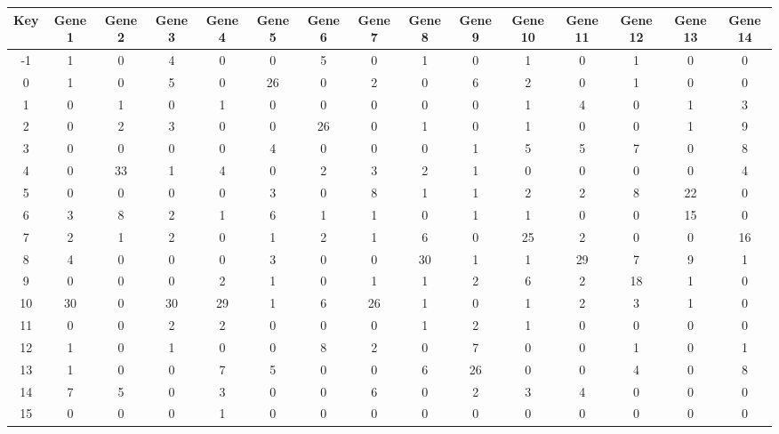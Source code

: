 \begin{tabular}{|c|c|c|c|c|c|c|c|c|c|c|c|c|c|c|}
\hline
Key & Gene 1 & Gene 2 & Gene 3 & Gene 4 & Gene 5 & Gene 6 & Gene 7 & Gene 8 & Gene 9 & Gene 10 & Gene 11 & Gene 12 & Gene 13 & Gene 14 \\
\hline
-1 & 1 & 0 & 4 & 0 & 0 & 5 & 0 & 1 & 0 & 1 & 0 & 1 & 0 & 0 \\
0 & 1 & 0 & 5 & 0 & 26 & 0 & 2 & 0 & 6 & 2 & 0 & 1 & 0 & 0 \\
1 & 0 & 1 & 0 & 1 & 0 & 0 & 0 & 0 & 0 & 1 & 4 & 0 & 1 & 3 \\
2 & 0 & 2 & 3 & 0 & 0 & 26 & 0 & 1 & 0 & 1 & 0 & 0 & 1 & 9 \\
3 & 0 & 0 & 0 & 0 & 4 & 0 & 0 & 0 & 1 & 5 & 5 & 7 & 0 & 8 \\
4 & 0 & 33 & 1 & 4 & 0 & 2 & 3 & 2 & 1 & 0 & 0 & 0 & 0 & 4 \\
5 & 0 & 0 & 0 & 0 & 3 & 0 & 8 & 1 & 1 & 2 & 2 & 8 & 22 & 0 \\
6 & 3 & 8 & 2 & 1 & 6 & 1 & 1 & 0 & 1 & 1 & 0 & 0 & 15 & 0 \\
7 & 2 & 1 & 2 & 0 & 1 & 2 & 1 & 6 & 0 & 25 & 2 & 0 & 0 & 16 \\
8 & 4 & 0 & 0 & 0 & 3 & 0 & 0 & 30 & 1 & 1 & 29 & 7 & 9 & 1 \\
9 & 0 & 0 & 0 & 2 & 1 & 0 & 1 & 1 & 2 & 6 & 2 & 18 & 1 & 0 \\
10 & 30 & 0 & 30 & 29 & 1 & 6 & 26 & 1 & 0 & 1 & 2 & 3 & 1 & 0 \\
11 & 0 & 0 & 2 & 2 & 0 & 0 & 0 & 1 & 2 & 1 & 0 & 0 & 0 & 0 \\
12 & 1 & 0 & 1 & 0 & 0 & 8 & 2 & 0 & 7 & 0 & 0 & 1 & 0 & 1 \\
13 & 1 & 0 & 0 & 7 & 5 & 0 & 0 & 6 & 26 & 0 & 0 & 4 & 0 & 8 \\
14 & 7 & 5 & 0 & 3 & 0 & 0 & 6 & 0 & 2 & 3 & 4 & 0 & 0 & 0 \\
15 & 0 & 0 & 0 & 1 & 0 & 0 & 0 & 0 & 0 & 0 & 0 & 0 & 0 & 0 \\
\hline
\end{tabular}